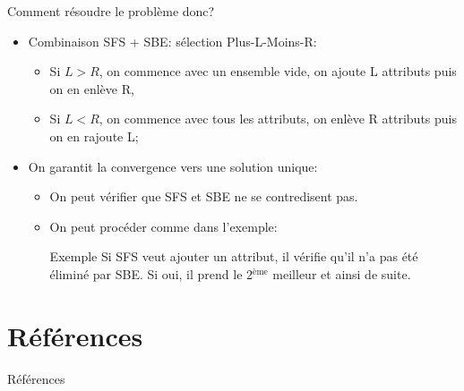 \documentclass[8pt]{beamer}
\begin{document}
	\begin{frame}{Comment résoudre le problème donc?}
		\begin{itemize}
			\item<1-> Combinaison SFS + SBE\@: sélection Plus-L-Moins-R\@:
			\begin{itemize}
				\item Si $L > R$, on commence avec un ensemble vide, on ajoute L attributs puis on en enlève R\@,
				\item Si $L < R$, on commence avec tous les attributs, on enlève R attributs puis on en rajoute L\@;
			\end{itemize}
			\item<2-> On garantit la convergence vers une solution unique:
			\begin{itemize}
				\item On peut vérifier que SFS et SBE ne se contredisent pas.
				\item On peut procéder comme dans l'exemple:
				\begin{block}{Exemple}
					Si SFS veut ajouter un attribut, il vérifie qu'il n'a pas été éliminé par SBE\@. Si oui, il prend le 2$^{\text{ème}}$ meilleur et ainsi de suite.
				\end{block}
			\end{itemize}
		\end{itemize}
	\end{frame}

	\section{Références}
	\begin{frame}[allowframebreaks]{Références}
		\nocite{sklearn_api}
		\nocite{camps2009kernel}
		\nocite{CC01a}
		
		
	\end{frame}
\end{document}

